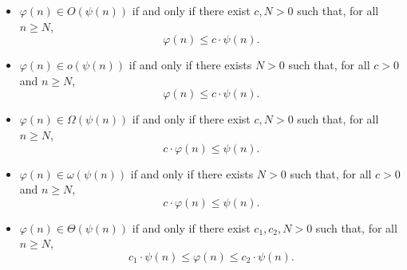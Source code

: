 \documentclass [preview, border = 20pt] {standalone}
\begin{document}
\pagecolor{black}
\color{white}
\begin{itemize}[label = ------,leftmargin = *]
\item $\varphi(n)\in O(\psi(n))$ if and only if there exist $c,N> 0$ such that, for all $n\ge N$, \[\varphi(n)\le c\cdot \psi(n).\]
\item $\varphi(n)\in o(\psi(n))$ if and only if there exists $N> 0$ such that, for all $c>0$ and $n\ge N$, \[\varphi(n)\le c\cdot \psi(n).\]
\item $\varphi(n)\in \Omega(\psi(n))$ if and only if there exist $c,N> 0$ such that, for all $n\ge N$, \[c\cdot \varphi(n)\le \psi(n).\]
\item $\varphi(n)\in \omega(\psi(n))$ if and only if there exists $N> 0$ such that, for all $c>0$ and $n\ge N$, \[c\cdot\varphi(n)\le \psi(n).\]
\item $\varphi(n)\in \Theta(\psi(n))$ if and only if there exist $c_1,c_2,N> 0$ such that, for all $n\ge N$, \[c_1\cdot \psi(n)\le \varphi(n)\le c_2\cdot \psi(n).\]
\end{itemize}
\end{document}

